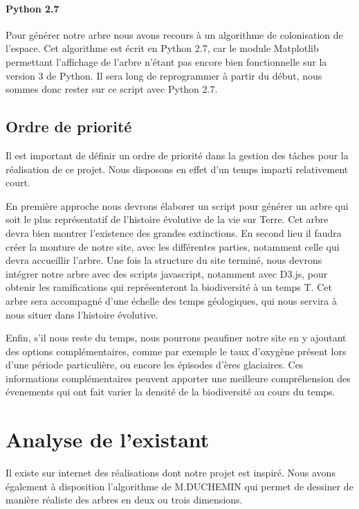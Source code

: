 \documentclass[a4paper]{article}
\begin{document}
		\paragraph{Python 2.7}
		Pour générer notre arbre nous avons recours à un algorithme de colonisation de l'espace. Cet algorithme est écrit en Python 2.7, car le module Matplotlib permettant l'affichage de l'arbre n'étant pas encore bien fonctionnelle sur la version 3 de Python. Il sera long de reprogrammer à partir du début, nous sommes donc rester sur ce script avec Python 2.7. 
	
	\subsection{Ordre de priorité}
		
		Il est important de définir un ordre de priorité dans la gestion des tâches pour la réalisation de ce projet. Nous disposons en effet d'un temps imparti relativement court.

		
		En première approche nous devrons élaborer un script pour générer un arbre qui soit le plus représentatif de l'histoire évolutive de la vie sur Terre. Cet arbre devra bien montrer l'existence des grandes extinctions. 
		En second lieu il faudra créer la monture de notre site, avec les différentes parties, notamment celle qui devra accueillir l'arbre.
		Une fois la structure du site terminé, nous devrons intégrer notre arbre avec des scripts javascript, notamment avec D3.js, pour obtenir les ramifications qui représenteront la biodiversité à un temps T. Cet arbre sera accompagné d'une échelle des temps géologiques, qui nous servira à nous situer dans l'histoire évolutive.

		
		Enfin, s'il nous reste du temps, nous pourrons peaufiner notre site en y ajoutant des options complémentaires, comme par exemple le taux d'oxygène présent lors d'une période particulière, ou encore les épisodes d'ères glaciaires. Ces informations complémentaires peuvent apporter une meilleure compréhension des évenements qui ont fait varier la densité de la biodiversité au cours du temps.

\section{Analyse de l'existant}
	Il existe sur internet des réalisations dont notre projet est inspiré. Nous avons également à disposition l'algorithme de M.DUCHEMIN qui permet de dessiner de manière réaliste des arbres en deux ou trois dimensions.
\end{document}
